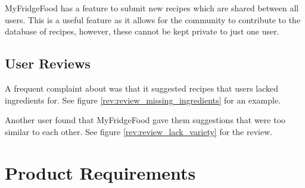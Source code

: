 MyFridgeFood has a feature to submit new recipes which are shared between all users. This is a useful feature as it allows for the community to contribute to the database
of recipes, however, these cannot be kept private to just one user.

\subsection{User Reviews}

A frequent complaint about \cite{myfridgefood_myfridgefood_nodate} was that it suggested
recipes that users lacked ingredients for. See figure \ref{rev:review_missing_ingredients} for an example.

Another user found that MyFridgeFood gave them suggestions that were too similar to each
other. See figure \ref{rev:review_lack_variety} for the review.

\section{Product Requirements}

\newcommand{\requirementtype}{FR}
\newcommand{\requirement}[3]{
    \requirementtype\stepcounter{functionalreqcounter}\arabic{functionalreqcounter}
        &
    #1
        &
    #2
        &
    #3
        \\\hline
}

